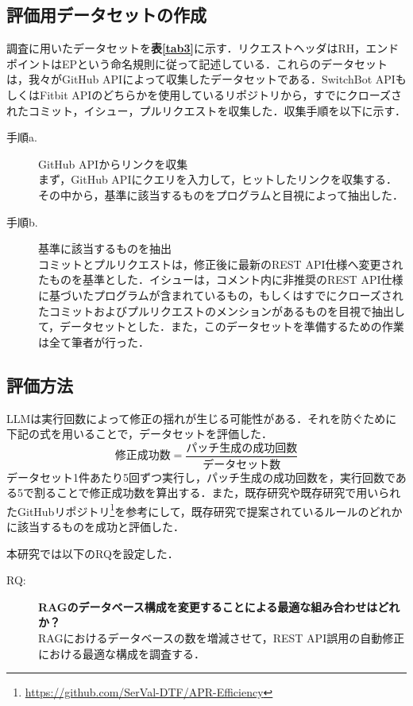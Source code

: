 \documentclass[uplatex,dvipdfmx,a4paper,twocolumn,base=12pt,jbase=12pt,ja=standard]{bxjsarticle}
\begin{document}
\subsection{評価用データセットの作成}

調査に用いたデータセットを\textbf{表\ref{tab3}}に示す．リクエストヘッダはRH，エンドポイントはEPという命名規則に従って記述している．これらのデータセットは，我々がGitHub APIによって収集したデータセットである．SwitchBot APIもしくはFitbit APIのどちらかを使用しているリポジトリから，すでにクローズされたコミット，イシュー，プルリクエストを収集した．収集手順を以下に示す．
\begin{description}
    \item[手順a. ] GitHub APIからリンクを収集 \\
    まず，GitHub APIにクエリを入力して，ヒットしたリンクを収集する．その中から，基準に該当するものをプログラムと目視によって抽出した．
    \item[手順b. ] 基準に該当するものを抽出 \\
    コミットとプルリクエストは，修正後に最新のREST API仕様へ変更されたものを基準とした．イシューは，コメント内に非推奨のREST API仕様に基づいたプログラムが含まれているもの，もしくはすでにクローズされたコミットおよびプルリクエストのメンションがあるものを目視で抽出して，データセットとした．また，このデータセットを準備するための作業は全て筆者が行った．
\end{description}


\subsection{評価方法}
LLMは実行回数によって修正の揺れが生じる可能性がある．それを防ぐために下記の式を用いることで，データセットを評価した．
\[
\text{修正成功数} = \frac{\text{パッチ生成の成功回数}}{\text{データセット数}}
\]
データセット1件あたり5回ずつ実行し，パッチ生成の成功回数を，実行回数である5で割ることで修正成功数を算出する．また，既存研究\cite{liu2020efficiency}や既存研究で用いられたGitHubリポジトリ\footnote{\url{https://github.com/SerVal-DTF/APR-Efficiency}}を参考にして，既存研究で提案されているルールのどれかに該当するものを成功と評価した．


本研究では以下のRQを設定した．
\begin{description}
    \item [RQ:] {\bf RAGのデータベース構成を変更することによる最適な組み合わせはどれか？}\\
    RAGにおけるデータベースの数を増減させて，REST API誤用の自動修正における最適な構成を調査する．
\end{description}
\end{document}
